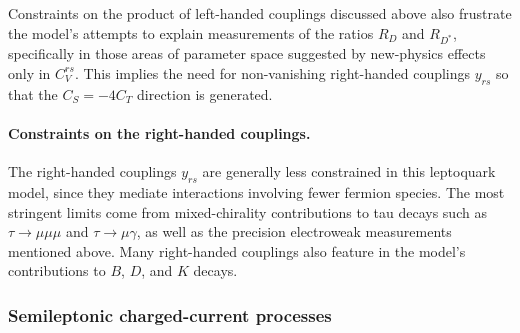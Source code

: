 Constraints on the product of left-handed couplings discussed above also
frustrate the model's attempts to explain measurements of the ratios $R_D$ and
$R_{D^{*}}$, specifically in those areas of parameter space suggested by
new-physics effects only in $C_V^{rs}$. This implies the need for non-vanishing
right-handed couplings $y_{rs}$ so that the $C_{S} = - 4 C_{T}$ direction is
generated.

\paragraph{Constraints on the right-handed couplings.} The right-handed
couplings $y_{rs}$ are generally less constrained in this leptoquark model,
since they mediate interactions involving fewer fermion species. The most
stringent limits come from mixed-chirality contributions to tau decays such as
$\tau \to \mu \mu \mu$ and $\tau \to \mu \gamma$, as well as the precision
electroweak measurements mentioned above. Many right-handed couplings also
feature in the model's contributions to $B$, $D$, and $K$ decays.

\subsubsection{Semileptonic charged-current processes}
\label{sec:ch3-semileptonicchargedcurrentprocesses}

